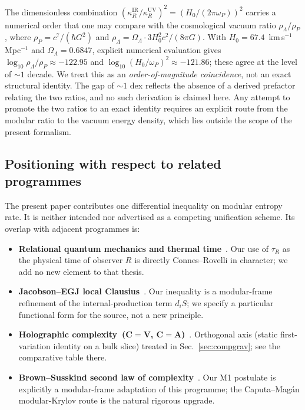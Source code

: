 \documentclass[aps,prd,superscriptaddress,nofootinbib,floatfix,10pt]{revtex4-2}
\theoremstyle{remark}
\newcommand{\tauR}{\tau_{R}}
\newcommand{\kR}{\kappa_{R}}
\begin{document}
The dimensionless combination
$\left(\kR^{\mathrm{IR}}/\kR^{\mathrm{UV}}\right)^{2}
 = (H_{0}/(2\pi\omega_{P}))^{2}$
carries a numerical order that one may compare with the cosmological
vacuum ratio $\rho_{\Lambda}/\rho_{P}$, where
$\rho_{P}=c^{7}/(\hbar G^{2})$ and $\rho_{\Lambda}
= \Omega_{\Lambda} \cdot 3 H_{0}^{2} c^{2}/(8\pi G)$. With
$H_{0}=67.4$~km\,s$^{-1}$\,Mpc$^{-1}$ and $\Omega_{\Lambda}=0.6847$,
explicit numerical evaluation gives
$\log_{10}\rho_{\Lambda}/\rho_{P}\approx -122.95$ and
$\log_{10}(H_{0}/\omega_{P})^{2}\approx -121.86$; these agree at the
level of $\sim 1$ decade. We treat this as an
\emph{order-of-magnitude coincidence}, not an exact structural
identity. The gap of $\sim 1$ dex reflects the absence of a derived
prefactor relating the two ratios, and no such derivation is claimed
here. Any attempt to promote the two ratios to an exact identity
requires an explicit route from the modular ratio to the vacuum
energy density, which lies outside the scope of the present
formalism.

\subsection{Positioning with respect to related programmes}
\label{sec:outlook:programmes}

The present paper contributes one differential inequality on modular
entropy rate. It is neither intended nor advertised as a competing
unification scheme. Its overlap with adjacent programmes is:

\begin{itemize}[leftmargin=2em,itemsep=4pt]
 \item \textbf{Relational quantum mechanics and thermal
   time}~\cite{ConnesRovelli1994}. Our use of $\tauR$ as the physical
   time of observer $R$ is directly Connes--Rovelli in character; we
   add no new element to that thesis.
 \item \textbf{Jacobson--EGJ local
   Clausius}~\cite{Jacobson1995}. Our inequality is a modular-frame
   refinement of the internal-production term $d_{i}S$; we specify a
   particular functional form for the source, not a new principle.
 \item \textbf{Holographic complexity~(C$=$V,
   C$=$A)}~\cite{Pedraza2022Threads,Carrasco2023}. Orthogonal axis
   (static first-variation identity on a bulk slice) treated in
   Sec.~\ref{sec:compgrav}; see the comparative table there.
 \item \textbf{Brown--Susskind second law of
   complexity}~\cite{BrownSusskind2018}. Our M1 postulate is
   explicitly a modular-frame adaptation of this programme; the
   Caputa--Mag\'an modular-Krylov route is the natural rigorous
   upgrade.
\end{itemize}
\end{document}
